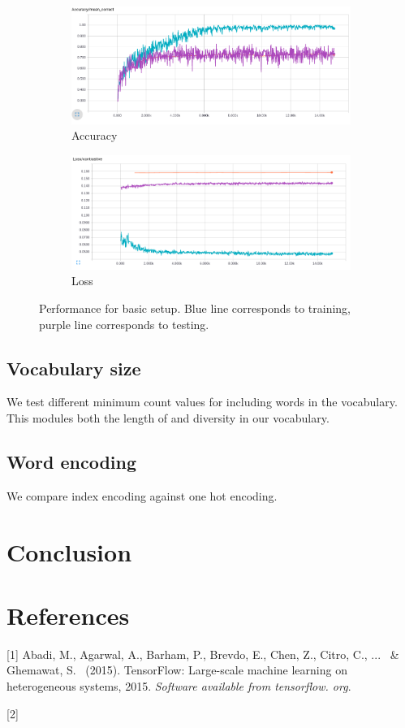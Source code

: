 \documentclass{article}
\begin{document}
\begin{figure}[H]
  \centering
  \begin{subfigure}{\textwidth}
  	\centering
  	\includegraphics[width=0.75\linewidth]{./images/accuracy.png}
  	\caption{Accuracy}
  \end{subfigure}
  \begin{subfigure}{\textwidth}
  	\centering
  	\includegraphics[width=0.75\linewidth]{./images/loss.png}
  	\caption{Loss}
  \end{subfigure}
  \caption{Performance for basic setup. Blue line corresponds to training, purple line corresponds to testing.}
  	\label{fig:performance}
\end{figure}

\subsection{Vocabulary size}
We test different minimum count values for including words in the vocabulary. This modules both the length of and diversity in our vocabulary.

\subsection{Word encoding}
We compare index encoding against one hot encoding.

\section{Conclusion}


\section*{References}

\small

[1] Abadi, M., Agarwal, A., Barham, P., Brevdo, E., Chen, Z., Citro, C., ... \ \& Ghemawat, S. \ (2015). TensorFlow: Large-scale machine learning on heterogeneous systems, 2015. {\it Software available from tensorflow. org}.

[2] 
\end{document}

